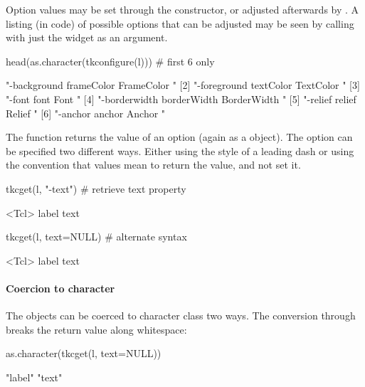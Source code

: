 Option values may be set through the constructor, or adjusted
afterwards by . A listing (in \TCL\/ code) of possible options
that can be adjusted may be seen by calling 
with just the widget as an argument.

\begin{Schunk}
\begin{Sinput}
 head(as.character(tkconfigure(l)))      # first 6 only
\end{Sinput}
\begin{Soutput}
[1] "-background frameColor FrameColor {} {}"   
[2] "-foreground textColor TextColor {} {}"     
[3] "-font font Font {} {}"                     
[4] "-borderwidth borderWidth BorderWidth {} {}"
[5] "-relief relief Relief {} {}"               
[6] "-anchor anchor Anchor {} {}"               
\end{Soutput}
\end{Schunk}

The  function returns the value of an
option (again as a  object). The option can be specified
two different ways. Either using the \TK\/ style of a leading dash or
using the convention that  values mean to return the value,
and not set it.


\begin{Schunk}
\begin{Sinput}
 tkcget(l, "-text")                      # retrieve text property
\end{Sinput}
\begin{Soutput}
<Tcl> label text 
\end{Soutput}
\begin{Sinput}
 tkcget(l, text=NULL)                    # alternate syntax
\end{Sinput}
\begin{Soutput}
<Tcl> label text 
\end{Soutput}
\end{Schunk}

\paragraph{Coercion to character}
The  objects can be coerced to character class two ways.
The conversion through  breaks the return value along whitespace:
\begin{Schunk}
\begin{Sinput}
 as.character(tkcget(l, text=NULL))
\end{Sinput}
\begin{Soutput}
[1] "label" "text" 
\end{Soutput}
\end{Schunk}

